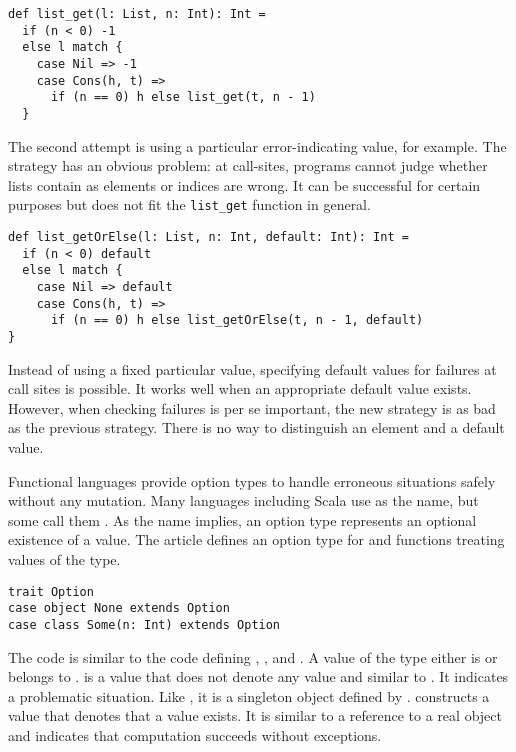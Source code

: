 \begin{verbatim}
def list_get(l: List, n: Int): Int =
  if (n < 0) -1
  else l match {
    case Nil => -1
    case Cons(h, t) =>
      if (n == 0) h else list_get(t, n - 1)
  }
\end{verbatim}

The second attempt is using a particular error-indicating value,  for
example. The strategy has an obvious problem: at call-sites, programs cannot
judge whether lists contain  as elements or indices are wrong. It can be
successful for certain purposes but does not fit the \verb!list_get! function in
general.

\begin{verbatim}
def list_getOrElse(l: List, n: Int, default: Int): Int =
  if (n < 0) default
  else l match {
    case Nil => default
    case Cons(h, t) =>
      if (n == 0) h else list_getOrElse(t, n - 1, default)
}
\end{verbatim}

Instead of using a fixed particular value, specifying default values for failures
at call sites is possible. It works well when an appropriate default value
exists. However, when checking failures is per se important, the new strategy is
as bad as the previous strategy. There is no way to distinguish an element and a
default value.

Functional languages provide option types to handle erroneous situations safely
without any mutation. Many languages including Scala use  as the
name, but some call them . As the name implies, an option type
represents an optional existence of a value. The article defines an option type
for  and functions treating values of the type.

\begin{verbatim}
trait Option
case object None extends Option
case class Some(n: Int) extends Option
\end{verbatim}

The code is similar to the code defining , , and
. A value of the  type either is  or belongs
to .  is a value that does not denote any value and similar
to . It indicates a problematic situation. Like , it is a
singleton object defined by .  constructs a value that
denotes that a value exists. It is similar to a reference to a real object and
indicates that computation succeeds without exceptions.

